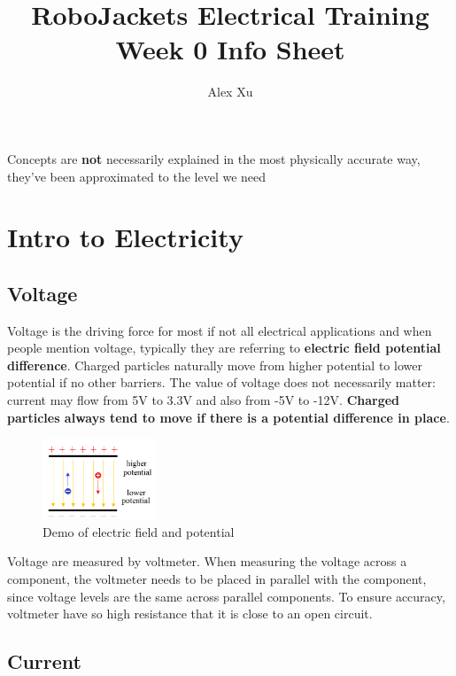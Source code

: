 \documentclass{article}
\title{RoboJackets Electrical Training Week 0 Info Sheet}
\author{Alex Xu}
\begin{document}
\maketitle{}
\setcounter{tocdepth}{2}
\tableofcontents
\vspace{120pt}
\large{Concepts are \textbf{not} necessarily explained in the most physically accurate way, they've been approximated to the level we need}

\pagebreak

\section{Intro to Electricity}
\subsection{Voltage}

Voltage is the driving force for most if not all electrical applications and when people mention voltage, typically they are referring to \textbf{electric field potential difference}. Charged particles naturally move from higher potential to lower potential if no other barriers. The value of voltage does not necessarily matter: current may flow from 5V to 3.3V and also from -5V to -12V. \textbf{Charged particles always tend to move if there is a potential difference in place}.

\begin{figure}[!h]
	\center
	\includegraphics[width=0.3\textwidth, keepaspectratio]{efield}
	\caption{Demo of electric field and potential}
	\label{fig:efield}
\end{figure}

Voltage are measured by voltmeter. When measuring the voltage across a component, the voltmeter needs to be placed in parallel with the component, since voltage levels are the same across parallel components. To ensure accuracy, voltmeter have so high resistance that it is close to an open circuit. 

\subsection{Current}
\end{document}
